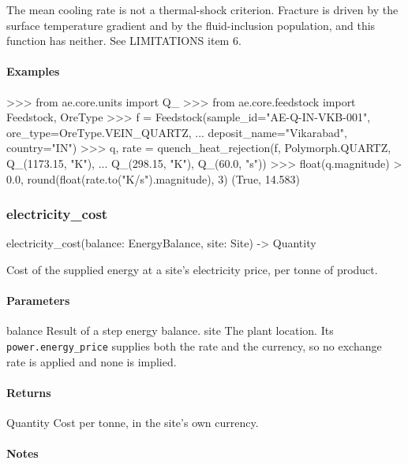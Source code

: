 \documentclass[10pt,a4paper,twoside]{report}
\begin{document}
The mean cooling rate is not a thermal-shock criterion. Fracture is driven by the surface temperature gradient and by the fluid-inclusion population, and this function has neither. See LIMITATIONS item 6.

\paragraph*{Examples}

\begin{doctestblock}
>>> from ae.core.units import Q_
>>> from ae.core.feedstock import Feedstock, OreType
>>> f = Feedstock(sample_id="AE-Q-IN-VKB-001", ore_type=OreType.VEIN_QUARTZ,
...               deposit_name="Vikarabad", country="IN")
>>> q, rate = quench_heat_rejection(f, Polymorph.QUARTZ, Q_(1173.15, "K"),
...                                 Q_(298.15, "K"), Q_(60.0, "s"))
>>> float(q.magnitude) > 0.0, round(float(rate.to("K/s").magnitude), 3)
(True, 14.583)
\end{doctestblock}

\subsubsection*{electricity\_cost}

\begin{verbatimsmall}
electricity_cost(balance: EnergyBalance, site: Site) -> Quantity
\end{verbatimsmall}

Cost of the supplied energy at a site's electricity price, per tonne of product.

\paragraph*{Parameters}

balance Result of a step energy balance. site The plant location. Its \texttt{power.energy\_price} supplies both the rate and the currency, so no exchange rate is applied and none is implied.

\paragraph*{Returns}

Quantity Cost per tonne, in the site's own currency.

\paragraph*{Notes}
\end{document}
